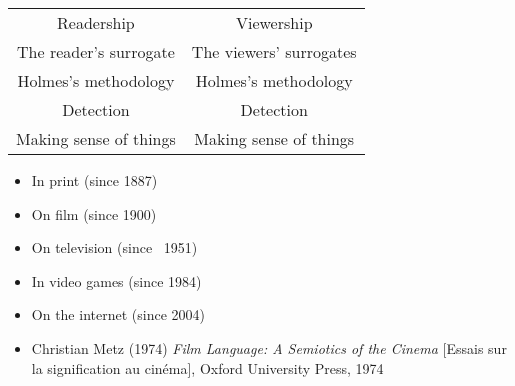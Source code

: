\documentclass[a4paper,landscape,headrule,footrule,xetex]{foils}
\begin{document}
\begin{center}
  \begin{tabular}{cc}
    Readership & Viewership \\
    The reader’s surrogate & The viewers’ surrogates \\
    Holmes’s methodology & Holmes’s methodology\\
    Detection & Detection \\
    Making sense of things & Making sense of things
  \end{tabular}
\end{center}
\begin{itemize}
\item In print (since 1887)
\item On film (since 1900)
\item On television (since ~1951)
\item In video games (since 1984)
\item On the internet (since 2004)
\end{itemize}



  \begin{itemize}
  \item  Christian Metz (1974) \textit{Film Language: A Semiotics of
      the Cinema} [Essais sur la signification au cinéma], Oxford
    University Press, 1974
  \end{itemize}
\end{document}
